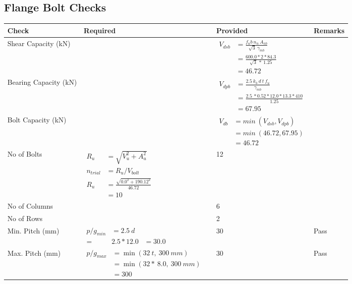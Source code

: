 \documentclass{article}%
\begin{document}
\subsection{Flange Bolt Checks}%
\label{subsec:FlangeBoltChecks}%
\renewcommand{\arraystretch}{1.2}%
\begin{longtable}{|p{4cm}|p{5cm}|p{5.5cm}|p{1.5cm}|}%
\hline%
\rowcolor{OsdagGreen}%
Check&Required&Provided&Remarks\\%
\hline%
\endhead%
\hline%
Shear Capacity (kN)&&$\begin{aligned}V_{dsb} &= \frac{f_ub ~n_n~ A_{nb}}{\sqrt{3} ~\gamma_{mb}}\\ &= \frac{600.0*2*84.3}{\sqrt{3}~*~1.25}\\ &= 46.72\end{aligned}$&\\%
\hline%
Bearing Capacity (kN)&&$\begin{aligned}V_{dpb} &= \frac{2.5~ k_b~ d~ t~ f_u}{\gamma_{mb}}\\ &= \frac{2.5~*0.52*12.0*13.3*410}{1.25}\\ &=67.95\end{aligned}$&\\%
\hline%
Bolt Capacity (kN)&&$\begin{aligned}V_{db} &= min~ (V_{dsb}, V_{dpb})\\ &= min~ (46.72,67.95)\\ &=46.72\end{aligned}$&\\%
\hline%
No of Bolts&$\begin{aligned}R_{u} &= \sqrt{V_u^2+A_u^2}\\ n_{trial} &= R_u/ V_{bolt}\\ R_{u} &= \frac{\sqrt{0.0^2+190.12^2}}{46.72}\\ &=10\end{aligned}$&12&\\%
\hline%
No of Columns&&6&\\%
\hline%
No of Rows&&2&\\%
\hline%
Min. Pitch (mm)&$\begin{aligned}p/g_{min}&= 2.5 ~ d&\\ =&2.5*12.0&=30.0\end{aligned}$&30&Pass\\%
\hline%
Max. Pitch (mm)&$\begin{aligned}p/g_{max} &=\min(32~t,~300~mm)&\\ &=\min(32 *~8.0,~ 300 ~mm)\\&=300\end{aligned}$&30&Pass\\%

\end{longtable}
\end{document}
